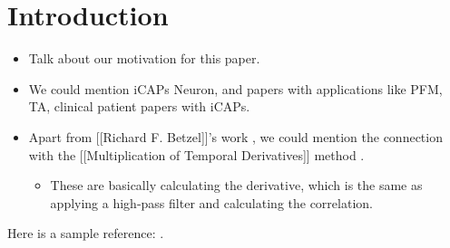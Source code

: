 \section{Introduction}

\begin{itemize}

    \item Talk about our motivation for this paper.

    \item We could mention iCAPs Neuron, and papers with applications like PFM, TA, clinical patient papers with iCAPs.

    \item Apart from [[Richard F. Betzel]]'s work \cite{betzel2020temporal,esfahlani2020high,faskowitz2020edge}, we could mention the connection with the
    [[Multiplication of Temporal Derivatives]] method \cite{shine2015estimation,shine2016dynamics}.

    \begin{itemize}
        \item These are basically calculating the derivative, which is the same as applying a high-pass filter and calculating the correlation.
    \end{itemize}

\end{itemize}

Here is a sample reference: \cite{gitelman2003modeling}.